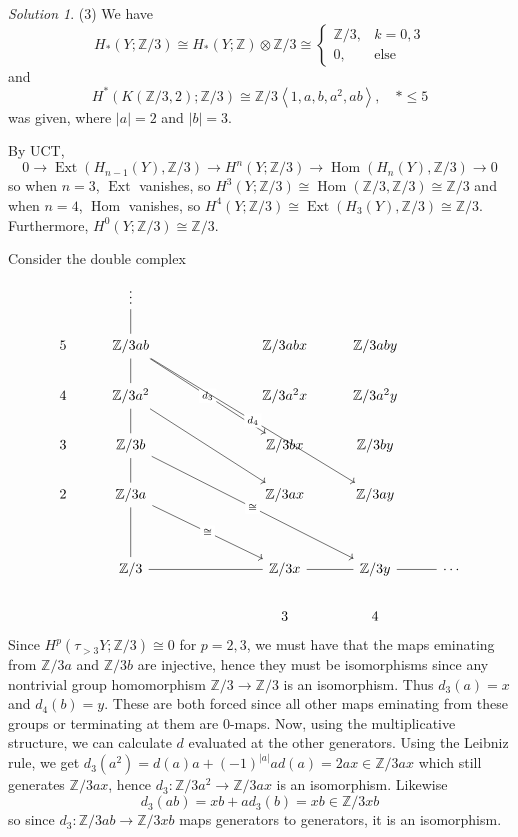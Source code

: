 \documentclass[reqno]{amsart}
\theoremstyle{definition}
\theoremstyle{remark}
\newtheorem*{solution}{Solution}
\DeclareMathOperator{\Hom}{Hom}
\DeclareMathOperator{\Ext}{Ext}
\begin{document}
\begin{solution}
(3) We have
\[
H_* (Y; \mathbb{Z}/3) \cong
H_* (Y;\mathbb{Z}) \otimes \mathbb{Z}/3
\cong
\begin{cases}
    \mathbb{Z}/3,& k=0,3\\
    0,& \text{else}
\end{cases}
\] 
and
\[
H^{*}\left( K\left( \mathbb{Z}/3,2 \right) ; \mathbb{Z}/3 \right) 
\cong
\mathbb{Z}/3 \left<1,a,b,a^2,ab \right>, \quad *\le 5
\] 
was given, where
$\left| a \right| =2$ and
$\left| b \right| =3$.

By UCT,
\[
0 \to \Ext \left( H_{n-1}(Y), \mathbb{Z}/3 \right) 
\to H^{n}(Y;\mathbb{Z}/3) \to 
\Hom \left( H_n (Y), \mathbb{Z}/3 \right) \to 0
\] 
so when $n=3$,
$\Ext$ vanishes, so
$H^{3}(Y;\mathbb{Z}/3) \cong
\Hom \left( \mathbb{Z}/3, \mathbb{Z}/3 \right) 
\cong \mathbb{Z}/3$ and
when $n=4$,
$\Hom$ vanishes, so
$H^{4}(Y;\mathbb{Z}/3) \cong
\Ext \left( H_3(Y),\mathbb{Z}/3 \right) 
\cong \mathbb{Z}/3$.
Furthermore,
$H^{0}(Y;\mathbb{Z}/3) \cong
\mathbb{Z}/3$.

Consider the double complex
\[\begin{tikzcd}
	& \vdots \\
	5 & {\mathbb{Z}/3 ab} &&& {\mathbb{Z}/3abx} & {\mathbb{Z}/3aby} \\
	4 & {\mathbb{Z}/3 a^2} &&& {\mathbb{Z}/3a^2x} & {\mathbb{Z}/3a^2y} \\
	3 & {\mathbb{Z}/3b} &&& {\mathbb{Z}/3bx} & {\mathbb{Z}/3by} \\
	2 & {\mathbb{Z}/3 a} &&& {\mathbb{Z}/3 ax} & {\mathbb{Z}/3ay} \\
	\\
	& {\mathbb{Z}/3} &&& {\mathbb{Z}/3 x} & {\mathbb{Z}/3y} & \cdots \\
	&&&& 3 & 4
	\arrow[no head, from=2-2, to=1-2]
	\arrow["{d_3}"{description}, from=2-2, to=4-5]
	\arrow["{d_4}"{description}, from=2-2, to=5-6]
	\arrow[no head, from=3-2, to=2-2]
	\arrow[from=3-2, to=5-5]
	\arrow[no head, from=4-2, to=3-2]
	\arrow["\cong"{description}, from=4-2, to=7-6]
	\arrow[no head, from=5-2, to=4-2]
	\arrow["\cong"{description}, from=5-2, to=7-5]
	\arrow[no head, from=7-2, to=5-2]
	\arrow[no head, from=7-2, to=7-5]
	\arrow[no head, from=7-5, to=7-6]
	\arrow[no head, from=7-6, to=7-7]
\end{tikzcd}\]
Since
$H^{p}(\tau_{>3}Y; \mathbb{Z}/3) \cong 0$ for
$p = 2,3$, we must have that the
maps eminating from
$\mathbb{Z} /3a$ and $\mathbb{Z}/3b$ are injective, hence
they must be isomorphisms since any
nontrivial group homomorphism
$\mathbb{Z}/3 \to \mathbb{Z}/3$ is an isomorphism.
Thus $d_3(a) = x$ and
$d_4(b) = y$. These are both forced since all other maps eminating
from these groups or terminating at them are $0$-maps.
Now, using the multiplicative structure, we can
calculate $d$ evaluated at the other generators.
Using the Leibniz rule, we get
$d_3 (a^2) = d(a) a + (-1)^{\left| a \right| } a d(a)
= 2ax \in \mathbb{Z}/3 ax
$ which still generates
$\mathbb{Z}/3ax$, hence
$d_3 \colon
\mathbb{Z}/3a^2 \to \mathbb{Z}/3 ax$ is an isomorphism.
Likewise
\[
d_3(ab) = 
x b + a d_3(b) = xb \in \mathbb{Z}/3 xb
\] 
so since $d_3 \colon \mathbb{Z}/3ab \to 
\mathbb{Z}/3 xb$ maps generators to generators,
it is an isomorphism.


\end{solution}
\end{document}
